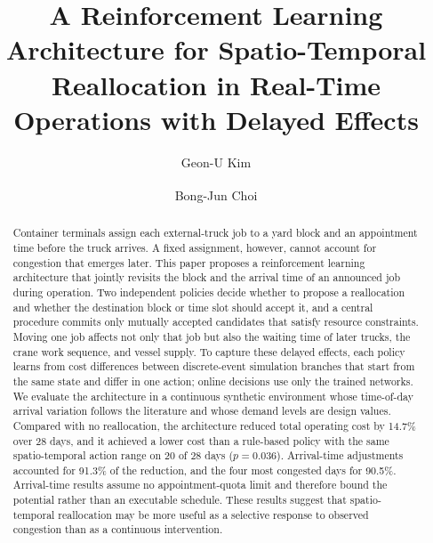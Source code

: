 \documentclass[a4paper]{llncs}
\begin{document}
\raggedbottom

\title{A Reinforcement Learning Architecture for Spatio-Temporal
Reallocation in Real-Time Operations with Delayed Effects}

\author{Geon-U Kim \and Bong-Jun Choi\textsuperscript{\Letter}}

\maketitle

\begin{abstract}
Container terminals assign each external-truck job to a yard block and
an appointment time before the truck arrives. A fixed assignment,
however, cannot account for congestion that emerges later. This paper
proposes a reinforcement learning architecture that jointly revisits the
block and the arrival time of an announced job during operation. Two
independent policies decide whether to propose a reallocation and
whether the destination block or time slot should accept it, and a
central procedure commits only mutually accepted candidates that satisfy
resource constraints. Moving one job affects not only that job but also
the waiting time of later trucks, the crane work sequence, and vessel
supply. To capture these delayed effects, each policy learns from cost
differences between discrete-event simulation branches that start from
the same state and differ in one action; online decisions use only the
trained networks. We evaluate the architecture in a continuous synthetic
environment whose time-of-day arrival variation follows the literature
and whose demand levels are design values. Compared with no
reallocation, the architecture reduced total operating cost by 14.7\%
over 28 days, and it achieved a lower cost than a rule-based policy with
the same spatio-temporal action range on 20 of 28 days ($p=0.036$).
Arrival-time adjustments accounted for 91.3\% of the reduction, and the
four most congested days for 90.5\%. Arrival-time results assume no
appointment-quota limit and therefore bound the potential rather than an
executable schedule. These results suggest that spatio-temporal
reallocation may be more useful as a selective response to observed
congestion than as a continuous intervention.

\end{abstract}
\end{document}
